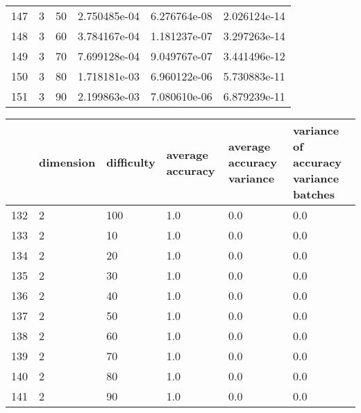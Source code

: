 \documentclass{article}
\begin{document}
\begin{center}
\begin{tabular}{llllll}
147 &         3 &         50 &  2.750485e-04 &          6.276764e-08 &                      2.026124e-14 \\
148 &         3 &         60 &  3.784167e-04 &          1.181237e-07 &                      3.297263e-14 \\
149 &         3 &         70 &  7.699128e-04 &          9.049767e-07 &                      3.441496e-12 \\
150 &         3 &         80 &  1.718181e-03 &          6.960122e-06 &                      5.730883e-11 \\
151 &         3 &         90 &  2.199863e-03 &          7.080610e-06 &                      6.879239e-11 \\
\bottomrule
\end{tabular}
\end{center}
\begin{center}
\begin{tabular}{llllll}
\toprule
{} & dimension & difficulty & average accuracy & average accuracy variance & variance of accuracy variance batches \\
\midrule
132 &         2 &        100 &              1.0 &                       0.0 &                                   0.0 \\
133 &         2 &         10 &              1.0 &                       0.0 &                                   0.0 \\
134 &         2 &         20 &              1.0 &                       0.0 &                                   0.0 \\
135 &         2 &         30 &              1.0 &                       0.0 &                                   0.0 \\
136 &         2 &         40 &              1.0 &                       0.0 &                                   0.0 \\
137 &         2 &         50 &              1.0 &                       0.0 &                                   0.0 \\
138 &         2 &         60 &              1.0 &                       0.0 &                                   0.0 \\
139 &         2 &         70 &              1.0 &                       0.0 &                                   0.0 \\
140 &         2 &         80 &              1.0 &                       0.0 &                                   0.0 \\
141 &         2 &         90 &              1.0 &                       0.0 &                                   0.0 \\

\end{tabular}
\end{center}
\end{document}
